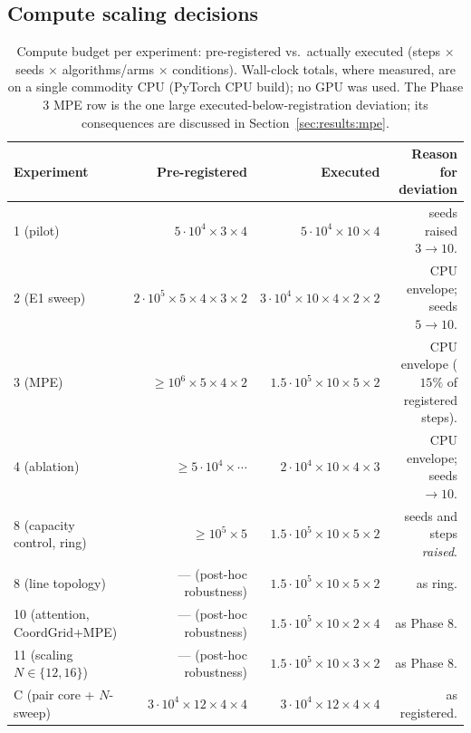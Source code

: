 \begin{appendices}
\section{Compute scaling decisions}
\label{app:budget}

\begin{table}
  \centering
  \caption{Compute budget per experiment: pre-registered vs.\ actually
  executed (steps $\times$ seeds $\times$ algorithms/arms $\times$
  conditions). Wall-clock totals, where measured, are on a single commodity
  CPU (PyTorch CPU build); no GPU was used. The Phase 3 MPE row is the one
  large executed-below-registration deviation; its consequences are
  discussed in Section~\ref{sec:results:mpe}.}
  \label{tab:budget}
  \footnotesize
  {
  \begin{tabular}{lrrr}
    \toprule
    Experiment & Pre-registered & Executed & Reason for deviation \\
    \midrule
    1 (pilot)       & $5\cdot 10^4 \times 3 \times 4$  & $5\cdot 10^4 \times 10 \times 4$ &
                      seeds raised $3\!\to\!10$. \\
    2 (E1 sweep)    & $2\cdot 10^5 \times 5 \times 4 \times 3 \times 2$ & $3\cdot 10^4 \times 10 \times 4 \times 2 \times 2$
                    & CPU envelope; seeds $5\!\to\!10$. \\
    3 (MPE)         & $\geq 10^6 \times 5 \times 4 \times 2$ & $1.5{\cdot}10^5 \times 10 \times 5 \times 2$
                    & CPU envelope ($15\%$ of registered steps). \\
    4 (ablation)    & $\geq 5\cdot 10^4 \times \cdots$  & $2\cdot 10^4 \times 10 \times 4 \times 3$
                    & CPU envelope; seeds $\to 10$. \\
    8 (capacity control, ring) & $\geq 10^5 \times 5$ & $1.5\cdot 10^5 \times 10 \times 5 \times 2$
                    & seeds and steps \emph{raised}. \\
    8 (line topology) & --- (post-hoc robustness) & $1.5\cdot 10^5 \times 10 \times 5 \times 2$ & as ring. \\
    10 (attention, CoordGrid+MPE) & --- (post-hoc robustness) & $1.5\cdot 10^5 \times 10 \times 2 \times 4$ & as Phase 8. \\
    11 (scaling $N\in\{12,16\}$) & --- (post-hoc robustness) & $1.5\cdot 10^5 \times 10 \times 3 \times 2$ & as Phase 8. \\
    C (pair core + $N$-sweep) & $3\cdot 10^4 \times 12 \times 4 \times 4$ & $3\cdot 10^4 \times 12 \times 4 \times 4$ & as registered. \\

\end{tabular}}
\end{table}
\end{appendices}
